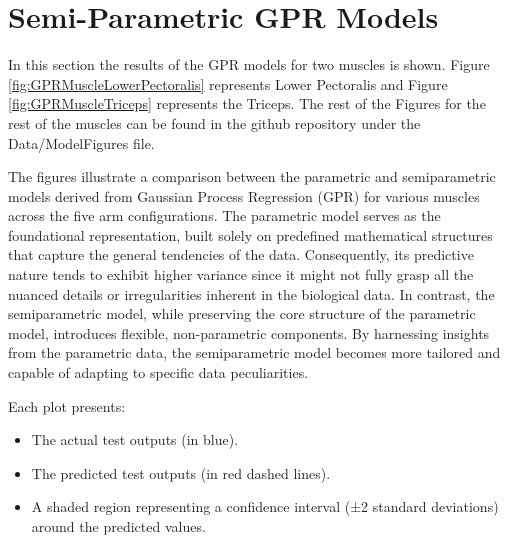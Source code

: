 \section{Semi-Parametric GPR Models}

In this section the results of the GPR models for two muscles is shown. Figure \ref{fig:GPRMuscleLowerPectoralis} represents Lower Pectoralis and Figure \ref{fig:GPRMuscleTriceps} represents the Triceps. The rest of the Figures for the rest of the muscles can be found in the github repository under the Data/ModelFigures file. 

The figures illustrate a comparison between the parametric and semiparametric models derived from Gaussian Process Regression (GPR) for various muscles across the five arm configurations. The parametric model serves as the foundational representation, built solely on predefined mathematical structures that capture the general tendencies of the data. Consequently, its predictive nature tends to exhibit higher variance since it might not fully grasp all the nuanced details or irregularities inherent in the biological data. In contrast, the semiparametric model, while preserving the core structure of the parametric model, introduces flexible, non-parametric components. By harnessing insights from the parametric data, the semiparametric model becomes more tailored and capable of adapting to specific data peculiarities.

Each plot presents:
\begin{itemize}
    \item The actual test outputs (in blue).
    \item The predicted test outputs (in red dashed lines).
    \item A shaded region representing a confidence interval (±2 standard deviations) around the predicted values.
\end{itemize}

